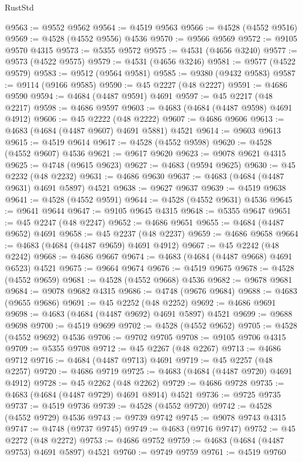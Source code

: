 \begin{lexlean}{RustStd}
\begin{coremodule}
@9563 := @9552 @9562
@9564 := @4519 @9563
@9566 := @4528 (@4552 @9516)
@9569 := @4528 (@4552 @9556) @4536
@9570 := @9566 @9569
@9572 := @9105 @9570 @4315
@9573 := @5355 @9572
@9575 := @4531 (@4656 @3240)
@9577 := @9573 (@4522 @9575)
@9579 := @4531 (@4656 @3246)
@9581 := @9577 (@4522 @9579)
@9583 := @9512 (@9564 @9581)
@9585 := @9380 (@9432 @9583)
@9587 := @9114 (@9166 @9585)
@9590 := @45 @2227 (@48 @2227)
@9591 := @4686 @9590
@9594 := @4684 (@4487 @9591) @4691
@9597 := @45 @2217 (@48 @2217)
@9598 := @4686 @9597
@9603 := @4683 (@4684 (@4487 @9598) @4691 @4912)
@9606 := @45 @2222 (@48 @2222)
@9607 := @4686 @9606
@9613 := @4683 (@4684 (@4487 @9607) @4691 @5881) @4521
@9614 := @9603 @9613
@9615 := @4519 @9614
@9617 := @4528 (@4552 @9598)
@9620 := @4528 (@4552 @9607) @4536
@9621 := @9617 @9620
@9623 := @9078 @9621 @4315
@9625 := @4748 (@9615 @9623)
@9627 := @4683 (@9594 @9625)
@9630 := @45 @2232 (@48 @2232)
@9631 := @4686 @9630
@9637 := @4683 (@4684 (@4487 @9631) @4691 @5897) @4521
@9638 := @9627 @9637
@9639 := @4519 @9638
@9641 := @4528 (@4552 @9591)
@9644 := @4528 (@4552 @9631) @4536
@9645 := @9641 @9644
@9647 := @9105 @9645 @4315
@9648 := @5355 @9647
@9651 := @45 @2247 (@48 @2247)
@9652 := @4686 @9651
@9655 := @4684 (@4487 @9652) @4691
@9658 := @45 @2237 (@48 @2237)
@9659 := @4686 @9658
@9664 := @4683 (@4684 (@4487 @9659) @4691 @4912)
@9667 := @45 @2242 (@48 @2242)
@9668 := @4686 @9667
@9674 := @4683 (@4684 (@4487 @9668) @4691 @6523) @4521
@9675 := @9664 @9674
@9676 := @4519 @9675
@9678 := @4528 (@4552 @9659)
@9681 := @4528 (@4552 @9668) @4536
@9682 := @9678 @9681
@9684 := @9078 @9682 @4315
@9686 := @4748 (@9676 @9684)
@9688 := @4683 (@9655 @9686)
@9691 := @45 @2252 (@48 @2252)
@9692 := @4686 @9691
@9698 := @4683 (@4684 (@4487 @9692) @4691 @5897) @4521
@9699 := @9688 @9698
@9700 := @4519 @9699
@9702 := @4528 (@4552 @9652)
@9705 := @4528 (@4552 @9692) @4536
@9706 := @9702 @9705
@9708 := @9105 @9706 @4315
@9709 := @5355 @9708
@9712 := @45 @2267 (@48 @2267)
@9713 := @4686 @9712
@9716 := @4684 (@4487 @9713) @4691
@9719 := @45 @2257 (@48 @2257)
@9720 := @4686 @9719
@9725 := @4683 (@4684 (@4487 @9720) @4691 @4912)
@9728 := @45 @2262 (@48 @2262)
@9729 := @4686 @9728
@9735 := @4683 (@4684 (@4487 @9729) @4691 @8914) @4521
@9736 := @9725 @9735
@9737 := @4519 @9736
@9739 := @4528 (@4552 @9720)
@9742 := @4528 (@4552 @9729) @4536
@9743 := @9739 @9742
@9745 := @9078 @9743 @4315
@9747 := @4748 (@9737 @9745)
@9749 := @4683 (@9716 @9747)
@9752 := @45 @2272 (@48 @2272)
@9753 := @4686 @9752
@9759 := @4683 (@4684 (@4487 @9753) @4691 @5897) @4521
@9760 := @9749 @9759
@9761 := @4519 @9760

\end{coremodule}
\end{lexlean}
